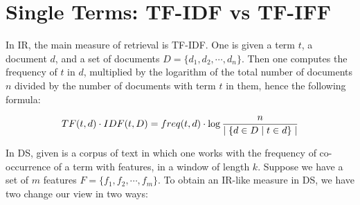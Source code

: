 




\section{Single Terms: TF-IDF vs TF-IFF}

In IR, the main measure of retrieval is TF-IDF. One is given a  term $t$,  a document $d$, and a set of documents $D = \{d_1, d_2, \cdots, d_n\}$. Then one computes  the frequency  of   $t$  in $d$, multiplied by  the logarithm of the  total number of documents $n$ divided by the number of documents with  term $t$ in them, hence the following formula:

\begin{equation}
\label{tf-idf}
TF(t,d) \cdot IDF(t, D) = freq(t, d) \cdot \log{{n} \over {\mid \{d \in D \mid t \in d\}\mid}}
\end{equation}

In DS, given is a corpus of text in which one works with the frequency of co-occurrence of a term with  features, in a window of length $k$.  Suppose we have a set of  $m$ features  $F = \{f_1, f_2, \cdots, f_m\}$.  To obtain an IR-like measure in DS, we  have two change our view in two ways: 

